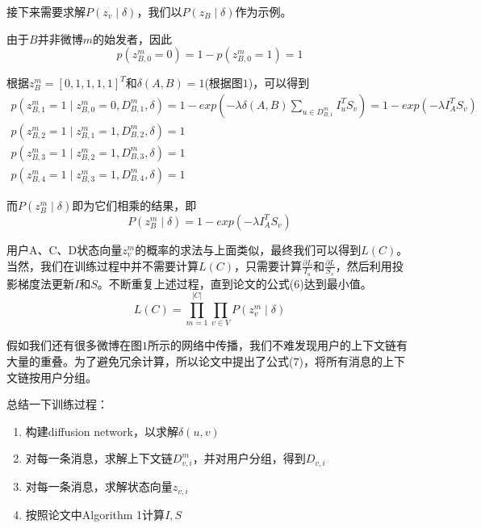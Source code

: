 \documentclass[UTF8]{ctexart}
\begin{document}
\par 接下来需要求解$P(z_{v}\mid \delta)$，我们以$P(z_{B}\mid \delta)$作为示例。
\par 由于$B$并非微博$m$的始发者，因此
\begin{equation*}
p(z_{B,0}^{m}=0) = 1-p(z_{B,0}^{m}=1) = 1
\end{equation*}
\par 根据$z_{B}^{m} = \left [ 0,1,1,1,1 \right ]^{T} $和$\delta(A,B)=1$(根据图$1$)，可以得到
\begin{equation*}
\begin{matrix}

p(z_{B,1}^{m}=1 \mid z_{B,0}^{m}=0,D_{B,1}^{m},\delta) = 1- exp(-\lambda \delta(A,B)\sum _{u\in D_{B,1}^{m}}I_{u}^{T}S_{v})=1-exp(-\lambda I_{A}^{T}S_{v}) \\
p(z_{B,2}^{m}=1 \mid z_{B,1}^{m}=1,D_{B,2}^{m},\delta) = 1 \\
p(z_{B,3}^{m}=1 \mid z_{B,2}^{m}=1,D_{B,3}^{m},\delta) = 1 \\
p(z_{B,4}^{m}=1 \mid z_{B,3}^{m}=1,D_{B,4}^{m},\delta) = 1 

\end{matrix}
\end{equation*}
\par 而$P(z_{B}^{m}\mid \delta) $即为它们相乘的结果，即
\begin{equation*}
P(z_{B}^{m}\mid \delta) = 1-exp(-\lambda I_{A}^{T}S_{v})
\end{equation*}
\par 用户A、C、D状态向量$z_{v}^{m}$的概率的求法与上面类似，最终我们可以得到$L(C)$。当然，我们在训练过程中并不需要计算$L(C)$，只需要计算$\frac{\partial L}{I_{u}}$和$\frac{\partial L}{S_{v}}$，然后利用投影梯度法更新$I$和$S$。不断重复上述过程，直到论文的公式($6$)达到最小值。
\begin{equation*}
L(C) = \prod _{m=1}^{\left | C \right |}\prod _{v \in V}P(z_{v}^{m} \mid \delta)
\end{equation*}
\par 假如我们还有很多微博在图$1$所示的网络中传播，我们不难发现用户的上下文链有大量的重叠。为了避免冗余计算，所以论文中提出了公式($7$)，将所有消息的上下文链按用户分组。
\par 总结一下训练过程：
\begin{enumerate}[\indent 1)]
    \item 构建diffusion network，以求解$\delta(u,v)$
    \item 对每一条消息，求解上下文链$D_{v,i}^{m}$，并对用户分组，得到$D_{v,i}$
    \item 对每一条消息，求解状态向量$z_{v,i}$
    \item 按照论文中Algorithm 1计算$I,S$
\end{enumerate}
\end{document}
